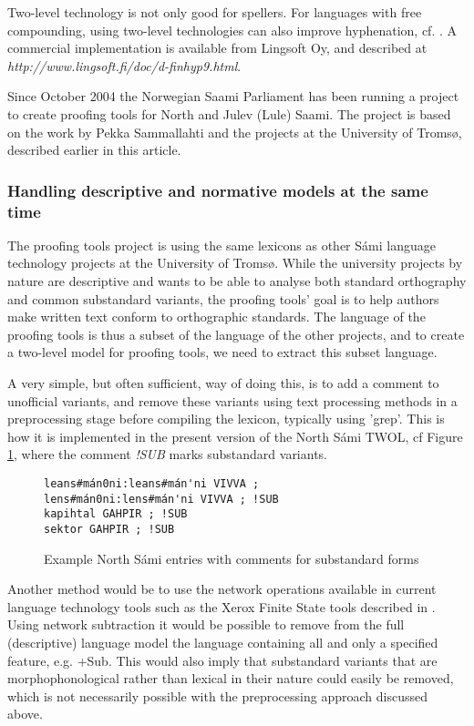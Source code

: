 \documentclass[a4paper,english]{article}
\begin{document}
Two-level technology is not only good for spellers. For languages with free compounding, using two-level technologies can also improve hyphenation, cf. \cite{Karlsson85}. A commercial implementation is available from Lingsoft Oy, and described at \textit{http://www.lingsoft.fi/doc/d-finhyp9.html}.

Since October 2004 the Norwegian Saami Parliament has been running a project to create proofing tools for North and Julev (Lule) Saami. The project is based on the work by Pekka Sammallahti and the projects at the University of Tromsø, described earlier in this article.

\subsubsection{Handling descriptive and normative models at the same time}

The proofing tools project is using the same lexicons as other Sámi language technology projects at the University of Tromsø. While the university projects by nature are descriptive and wants to be able to analyse both standard orthography and common substandard variants, the proofing tools' goal is to help authors make written text conform to orthographic standards. The language of the proofing tools is thus a subset of the language of the other projects, and to create a two-level model for proofing tools, we need to extract this subset language.

A very simple, but often sufficient, way of doing this, is to add a comment to unofficial variants, and remove these variants using text processing methods in a preprocessing stage before compiling the lexicon, typically using 'grep'. This is how it is implemented in the present version of the North Sámi TWOL, cf Figure \ref{sublex}, where the comment \textit{!SUB} marks  substandard variants.

\begin{figure}[htbp]
\begin{center}
\begin{verbatim}
leans#mán0ni:leans#mán'ni VIVVA ;
lens#mán0ni:lens#mán'ni VIVVA ; !SUB
kapihtal GAHPIR ; !SUB
sektor GAHPIR ; !SUB
\end{verbatim}
\caption{Example North Sámi entries with comments for substandard forms}
\label{sublex}
\end{center}
\end{figure}

Another method would be to use the network operations available in current language technology tools such as the Xerox Finite State tools described in \cite{Beesley03}. Using network subtraction it would be possible to remove from the full (descriptive) language model the language containing all and only a specified feature, e.g. +Sub. This would also imply that substandard variants that are morphophonological rather than lexical in their nature could easily be removed, which is not necessarily possible with the preprocessing approach discussed above.
\end{document}
